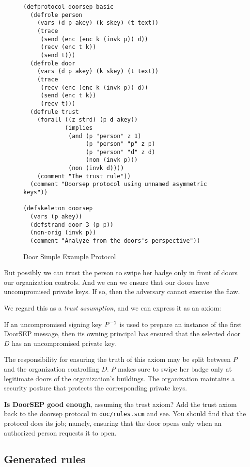 \begin{figure}\small
\begin{verbatim}
(defprotocol doorsep basic
  (defrole person
    (vars (d p akey) (k skey) (t text))
    (trace
     (send (enc (enc k (invk p)) d))
     (recv (enc t k))
     (send t)))
  (defrole door
    (vars (d p akey) (k skey) (t text))
    (trace
     (recv (enc (enc k (invk p)) d))
     (send (enc t k))
     (recv t)))
  (defrule trust
    (forall ((z strd) (p d akey))
            (implies
             (and (p "person" z 1)
                  (p "person" "p" z p)
                  (p "person" "d" z d)
                  (non (invk p)))
             (non (invk d))))
    (comment "The trust rule"))
  (comment "Doorsep protocol using unnamed asymmetric keys"))

(defskeleton doorsep
  (vars (p akey))
  (defstrand door 3 (p p))
  (non-orig (invk p))
  (comment "Analyze from the doors's perspective"))
\end{verbatim}
\caption{Door Simple Example Protocol}\label{fig:doorsep}
\end{figure}

But possibly we can trust the person to swipe her badge only in front
of doors our organization controls.  And we can we ensure that our
doors have uncompromised private keys.  If so, then the adversary
cannot exercise the flaw.

We regard this as a \emph{trust assumption}, and we can express it as
an axiom:
%
\begin{axiom}\label{axiom:trust assumption}
  If an uncompromised signing key ${{P}^{-1}}$ is used to prepare an
  instance of the first DoorSEP message, then its owning principal has
  ensured that the selected door $D$ has an uncompromised private key.
\end{axiom}
%
The responsibility for ensuring the truth of this axiom may be split
between $P$ and the organization controlling $D$.  $P$ makes sure to
swipe her badge only at legitimate doors of the organization's
buildings.  The organization maintains a security posture that
protects the corresponding private keys.

\medskip\noindent\textbf{Is DoorSEP good enough}, assuming the trust
axiom?  Add the trust axiom back to the doorsep protocol in
\texttt{doc/rules.scm} and see.  You should find that the protocol
does its job; namely, ensuring that the door opens only when an
authorized person requests it to open.

\subsection{Generated rules}
\label{sec:goals:rules:gen}

